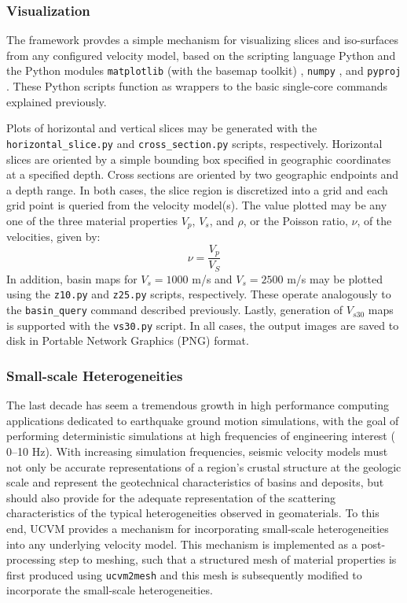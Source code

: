\subsubsection{Visualization}

The framework provdes a simple mechanism for visualizing slices and iso-surfaces from any configured velocity model, based on the scripting language Python and the Python modules \texttt{matplotlib} (with the basemap toolkit) \citep{Hunter_2007_CSE}, \texttt{numpy} %
, and \texttt{pyproj} %
. These Python scripts function as wrappers to the basic single-core commands explained previously.

Plots of horizontal and vertical slices may be generated with the \texttt{horizontal\_slice.py} and \texttt{cross\_section.py} scripts, respectively. Horizontal slices are oriented by a simple bounding box specified in geographic coordinates at a specified depth. Cross sections are oriented by two geographic endpoints and a depth range. In both cases, the slice region is discretized into a grid and each grid point is queried from the velocity model(s). The value plotted may be any one of the three material properties $V_p$, $V_s$, and $\rho$, or the Poisson ratio, $\nu$, of the velocities, given by:
\begin{equation}
\nu = \frac{V_p}{V_S}
\end{equation}
In addition, basin maps for $V_s = 1000$ m/s and $V_s = 2500$ m/s may be plotted using the \texttt{z10.py} and \texttt{z25.py} scripts, respectively. These operate analogously to the \texttt{basin\_query} command described previously. Lastly, generation of $V_{s30}$ maps is supported with the \texttt{vs30.py} script. In all cases, the output images are saved to disk in Portable Network Graphics (PNG) format.

\subsubsection{Small-scale Heterogeneities}

The last decade has seem a tremendous growth in high performance computing applications dedicated to earthquake ground motion simulations, with the goal of performing deterministic simulations at high frequencies of engineering interest (\fmax{} 0--10 Hz). With increasing simulation frequencies, seismic velocity models must not only be accurate representations of a region's crustal structure at the geologic scale and represent the geotechnical characteristics of basins and deposits, but should also provide for the adequate representation of the scattering characteristics of the typical heterogeneities observed in geomaterials. To this end, UCVM provides a mechanism for incorporating small-scale heterogeneities into any underlying velocity model. This mechanism is implemented as a post-processing step to meshing, such that a structured mesh of material properties is first produced using \texttt{ucvm2mesh} and this mesh is subsequently modified to incorporate the small-scale heterogeneities.

